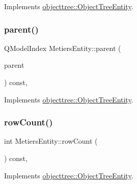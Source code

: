 Implements \mbox{\hyperlink{classobjecttree_1_1_object_tree_entity_a9ccaab3b27e65b1ed8b22f00c57a1082}{objecttree\+::\+Object\+Tree\+Entity}}.

\mbox{\label{classobjecttree_1_1_metiers_entity_aa7fde9b95a9b70ad5905a42adabc14e9}} 
\subsubsection{\texorpdfstring{parent()}{parent()}}
{\footnotesize\ttfamily Q\+Model\+Index Metiers\+Entity\+::parent (\begin{DoxyParamCaption}\item[{const Q\+Model\+Index \&}]{parent }\end{DoxyParamCaption}) const\hspace{0.3cm}{\ttfamily [override]}, {\ttfamily [virtual]}}



Implements \mbox{\hyperlink{classobjecttree_1_1_object_tree_entity_a2d1b13c056476f87637aacd7e99e7305}{objecttree\+::\+Object\+Tree\+Entity}}.

\mbox{\label{classobjecttree_1_1_metiers_entity_abf06cd3029120d0ac3f05ceb14951488}} 
\subsubsection{\texorpdfstring{rowCount()}{rowCount()}}
{\footnotesize\ttfamily int Metiers\+Entity\+::row\+Count (\begin{DoxyParamCaption}{ }\end{DoxyParamCaption}) const\hspace{0.3cm}{\ttfamily [override]}, {\ttfamily [virtual]}}



Implements \mbox{\hyperlink{classobjecttree_1_1_object_tree_entity_a82c626bb28c55dcfce11cf7ec3368588}{objecttree\+::\+Object\+Tree\+Entity}}.

\mbox{\label{classobjecttree_1_1_metiers_entity_a35236f555919a51a3f92518279fd41ca}} 
